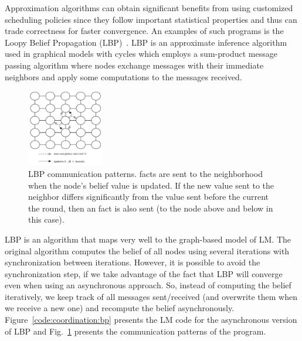 Approximation algorithms can obtain significant benefits from using customized
scheduling policies since they follow important statistical properties and thus
can trade correctness for faster convergence.  An examples of such programs is
the Loopy Belief Propagation (LBP)~\cite{Murphy99loopybelief}. LBP is an
approximate inference algorithm used in graphical models with cycles which
employs a sum-product message passing algorithm where nodes exchange messages
with their immediate neighbors and apply some computations to the messages
received.

\begin{figure}[h]
   \begin{center}
      \includegraphics[width=0.3\textwidth]{figures/bp/bp.pdf}
   \end{center}

   \caption{LBP communication patterns.  facts are
   sent to the neighborhood when the node's belief value is updated. If the new
   value sent to the neighbor differs significantly from the value sent before
   the current the round, then an  fact is also sent (to the node
   above and below in this case).}

\label{fig:coordination:bp}
\end{figure}

LBP is an algorithm that maps very well to the graph-based model of LM. The
original algorithm computes the belief of all nodes using several iterations
with synchronization between iterations. However, it is possible to avoid the
synchronization step, if we take advantage of the fact that LBP will converge
even when using an asynchronous approach. So, instead of computing the belief
iteratively, we keep track of all messages sent/received (and overwrite them
when we receive a new one) and recompute the belief asynchronously.
Figure~\ref{code:coordination:bp} presents the LM code for the asynchronous
version of LBP and Fig.~\ref{fig:coordination:bp} presents the communication
patterns of the program.

